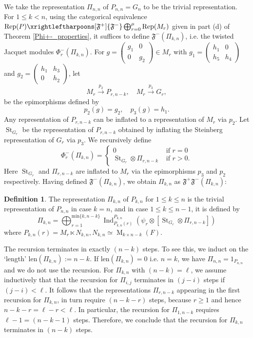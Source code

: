 \documentclass[reqno]{amsart}
\theoremstyle{definition}
\newtheorem{definition}[theorem]{Definition}
\theoremstyle{remark}
\numberwithin{equation}{section}
\newcommand{\fF}{\mathfrak F}
\DeclareMathOperator{\Ind}{Ind}
\DeclareMathOperator{\M}{M}
\DeclareMathOperator{\St}{St}
\newcommand{\bbsm}{\left (\begin{smallmatrix}}      \newcommand{\besm}{\end{smallmatrix}\right )}
\begin{document}
We take the  representation $\Pi_{n,n}$ of $P_{n,n} =G_n$ to be the trivial representation. For $1 \leq k<n$, using the categorical equivalence  ${\rm Rep}(P) \xrightleftharpoons[\fF^+]{\fF^-}\bigoplus_{r=0}^\mu {\rm Rep}(M_r)$ 
given in  part (d) of Theorem \ref{Phi+-_properties}, 
it suffices to define $\fF^-(\Pi_{k,n})$, i.e. the twisted Jacquet modules $\Phi_r^-(\Pi_{k,n})$.  For $g=\bbsm g_1&0\\0&g_2 \besm \in M_r$ with 
$g_1=\bbsm h_1 &  0\\
    h_5 & h_4\besm$ and $g_2=\bbsm
    h_1& h_3\\0&h_2 \besm$, let 
    \[  M_r \xrightarrow{p_2} P_{r,n-k}, \quad  M_r \xrightarrow{p_3} G_r,\]
    be the epimorphisms defined by 
    \[  p_2(g)=g_2, \quad  p_3(g)=h_1.\]
Any representation of $P_{r,n-k}$ can be inflated to a representation of $M_r$ via $p_2$. Let $\St_{G_r}$ be the representation of $P_{r,n-k}$ obtained by inflating the Steinberg representation  of $G_r$ via $p_3$. We recursively define
\[ \Phi_r^-(\Pi_{k,n})= \begin{cases}
     0 &\text{ if $r=0$}\\
\St_{G_r} \otimes \Pi_{r,n-k} &\text{ if $r>0$}.     
\end{cases}\]
Here $\St_{G_r}$ and  $\Pi_{r,n-k}$ are inflated to $M_r$ via the epimorphisms $p_3$ and $p_2$ respectively. Having defined $\fF^-(\Pi_{k,n})$, we  obtain $\Pi_{k,n}$ as $\fF^+ \fF^-(\Pi_{k,n})$:
\begin{definition} \label{def_Pi} The representation $\Pi_{k,n}$ of $P_{k,n}$ for $1 \leq k \leq n$ is the trivial representation of $P_{n,n}$ in case $k=n$, and in case $1 \leq k \leq n-1$, it is defined by
\[\Pi_{k,n}=\bigoplus_{r=1}^{\text{min}\{k,n-k\}} \Ind_{P_{k,n}(r)}^{P_{k,n}} ( \psi_r \otimes [\St_{G_r} \otimes \Pi_{r,n-k}])
    \]
    where $P_{k,n}(r)=M_r \ltimes N_{k,n}, N_{k,n} \simeq \M_{k \times n-k}(F).$
\end{definition}
The recursion terminates in exactly  $(n-k)$  steps. To see this, we induct on the `length' len$(\Pi_{k,n}):=n-k$. If len$(\Pi_{k,n})=0$ i.e. $n=k$, we have $\Pi_{n,n}=1_{P_{n,n}}$ and we do not use the recursion.  For $\Pi_{k,n}$ with $(n-k)=\ell$, we assume inductively that that the recursion for $\Pi_{i,j}$ terminates in $(j-i)$ steps if $(j-i)<\ell$.  It follows that  the representations $\Pi_{r,n-k}$ appearing in the first  recursion for $\Pi_{k,n}$, in turn  require $(n-k-r)$ steps, because $r \geq 1$ and hence $n-k-r=\ell-r <\ell$. In particular, the recursion for $\Pi_{1,n-k}$ requires $\ell-1=(n-k-1)$ steps. Therefore, we conclude that the recursion for $\Pi_{k,n}$ terminates in $(n-k)$ steps. \\
 
\end{document}
